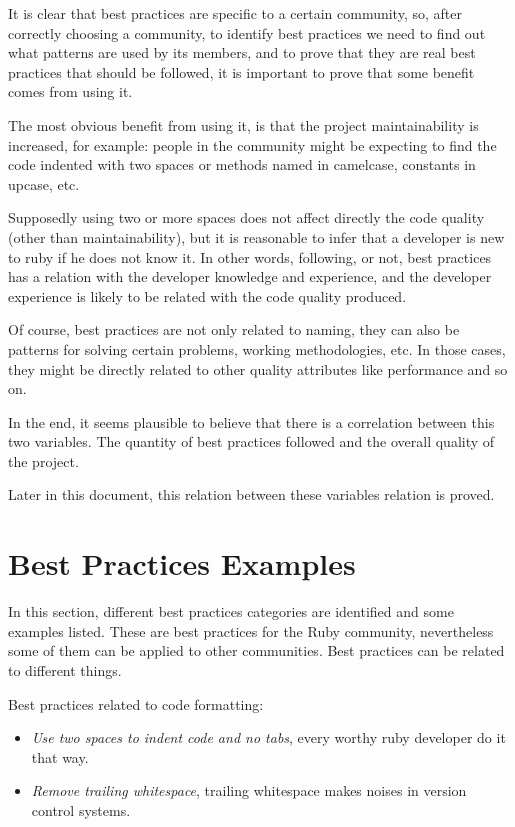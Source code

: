 It is clear that best practices are specific to a certain community, 
so, after correctly choosing a community, to identify best practices we need
to find out what patterns are used by its members, 
and to prove that they are real best practices that should be followed, 
it is important to prove that some benefit comes from using it.

The most obvious benefit from using it,
is that the project maintainability is increased,
for example: people in the community might be expecting to find the code indented with two spaces or 
methods named in camelcase, constants in upcase, etc.

Supposedly using two or more spaces does not affect directly the code quality (other than maintainability), 
but it is reasonable to infer that a developer is new to ruby if he does not know it.
In other words, following, or not, best practices has a relation with the developer knowledge and experience,
and the developer experience is likely to be related with the code quality produced.

Of course, best practices are not only related to naming,
they can also be patterns for solving certain problems, working methodologies, etc.
In those cases, they might be directly related to other quality attributes like performance and so on.

In the end, it seems plausible to believe that there is a correlation between this two variables.
The quantity of best practices followed and the overall quality of the project. 

Later in this document, this relation between these variables relation is proved.


\section{Best Practices Examples} \label{sec:best_practices_examples}
In this section, different best practices categories are identified and some examples listed.
These are best practices for the Ruby community, nevertheless some of them can be applied to other communities.
Best practices can be related to different things.


Best practices related to code formatting:
\begin{itemize}
\item \emph{Use two spaces to indent code and no tabs}, every worthy ruby developer do it that way.
\item \emph{Remove trailing whitespace}, trailing whitespace makes noises in version control systems.
\end{itemize}

